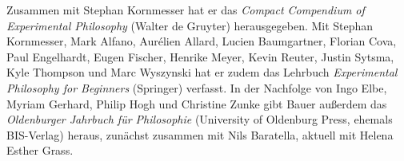\documentclass[justified,nobib,nohyper,symmetric,twoside]{tufte-book}
\begin{document}
Zusammen mit Stephan Kornmesser hat er das \textit{Compact Compendium of Experimental Philosophy} (Walter de Gruyter) herausgegeben.
Mit Stephan Kornmesser, Mark Alfano, Aurélien Allard, Lucien Baumgartner, Florian Cova, Paul Engelhardt, Eugen Fischer, Henrike Meyer, Kevin Reuter, Justin Sytsma, Kyle Thompson und Marc Wyszynski hat er zudem das Lehrbuch \textit{Experimental Philosophy for Beginners} (Springer) verfasst.
In der Nachfolge von Ingo Elbe, Myriam Gerhard, Philip Hogh und Christine Zunke gibt Bauer außerdem das \textit{Oldenburger Jahrbuch für Philosophie} (University of Oldenburg Press, ehemals BIS-Verlag) heraus, zunächst zusammen mit Nils Baratella, aktuell mit Helena Esther Grass.\\[1em]
\end{document}
